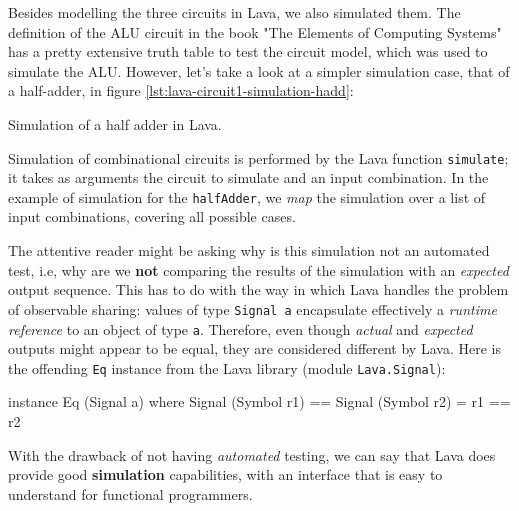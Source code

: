 \documentclass[a4paper]{article}
\begin{document}
                Besides modelling the three circuits in Lava, we also simulated them. The definition
                of the ALU circuit in the book "The Elements of Computing
                Systems"\cite{nand2tetris-book} has a pretty extensive truth table to test the
                circuit model, which was used to simulate the ALU. However, let's take a look at a
                simpler simulation case, that of a half-adder, in figure
                \ref{lst:lava-circuit1-simulation-hadd}:

                \begin{listing}[h!]
                    \caption{Simulation of a half adder in Lava.
                        \label{lst:lava-circuit1-simulation-hadd}}
                \end{listing}

                Simulation of combinational circuits is performed by the Lava function
                \texttt{simulate}; it takes as arguments the circuit to simulate and an input
                combination. In the example of simulation for the \texttt{halfAdder}, we \emph{map}
                the simulation over a list of input combinations, covering all possible cases.

                The attentive reader might be asking why is this simulation not an automated test,
                i.e, why are we \textbf{not} comparing the results of the simulation with an
                \emph{expected} output sequence. This has to do with the way in which Lava handles
                the problem of observable sharing: values of type \texttt{Signal a} encapsulate
                effectively a \emph{runtime reference} to an object of type \texttt{a}. Therefore,
                even though \emph{actual} and \emph{expected} outputs might appear to be equal, they
                are considered different by Lava. Here is the offending \texttt{Eq} instance from
                the Lava library (module \texttt{Lava.Signal}):

                \begin{haskellcode}
        instance Eq (Signal a) where
            Signal (Symbol r1) == Signal (Symbol r2) = r1 == r2
                \end{haskellcode}

                With the drawback of not having \emph{automated} testing, we can say that Lava does
                provide good \textbf{simulation} capabilities, with an interface that is easy to
                understand for functional programmers.
\end{document}
